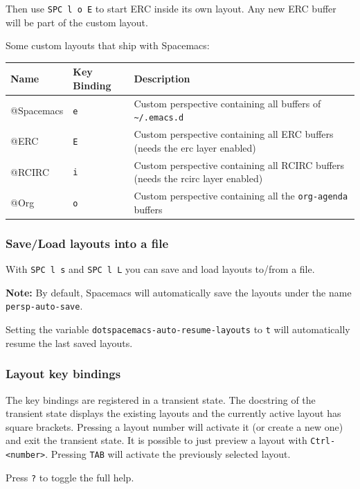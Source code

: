 \documentclass[11pt]{article}
\begin{document}
Then use \texttt{SPC l o E} to start ERC inside its own layout. Any new ERC buffer
will be part of the custom layout.

Some custom layouts that ship with Spacemacs:

\begin{center}
\begin{tabular}{lll}
Name & Key Binding & Description\\
\hline
@Spacemacs & \texttt{e} & Custom perspective containing all buffers of \texttt{\textasciitilde{}/.emacs.d}\\
@ERC & \texttt{E} & Custom perspective containing all ERC buffers (needs the erc layer enabled)\\
@RCIRC & \texttt{i} & Custom perspective containing all RCIRC buffers (needs the rcirc layer enabled)\\
@Org & \texttt{o} & Custom perspective containing all the \texttt{org-agenda} buffers\\
\end{tabular}
\end{center}

\subsubsection{Save/Load layouts into a file}
\label{sec:org00d18e3}
With \texttt{SPC l s} and \texttt{SPC l L} you can save and load layouts to/from a file.

\textbf{Note:} By default, Spacemacs will automatically save the layouts under the name
\texttt{persp-auto-save}.

Setting the variable \texttt{dotspacemacs-auto-resume-layouts} to \texttt{t} will
automatically resume the last saved layouts.

\subsubsection{Layout key bindings}
\label{sec:org450e0bb}
The key bindings are registered in a transient state. The docstring of the
transient state displays the existing layouts and the currently active
layout has square brackets. Pressing a layout number will activate it (or
create a new one) and exit the transient state. It is possible to just preview a
layout with \texttt{Ctrl-<number>}. Pressing \texttt{TAB} will activate the previously
selected layout.

Press \texttt{?} to toggle the full help.
\end{document}

